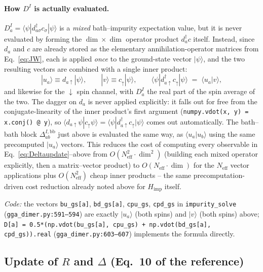 \documentclass[11pt]{article}
\newcommand{\Neff}{N_{\mathrm{eff}}}
\newcommand{\Himp}{H_{\mathrm{imp}}}
\begin{document}
\paragraph{How $D^I$ is actually evaluated.} $D^I_a=\langle\psi|d^\dagger_{a\sigma}c_\sigma|\psi\rangle$
is a \emph{mixed} bath--impurity expectation value, but it is never evaluated
by forming the $\dim\times\dim$ operator product $d^\dagger_ac$ itself.
Instead, since $d_a$ and $c$ are already stored as the elementary
annihilation-operator matrices from Eq.~\eqref{eq:JW}, each is applied
\emph{once} to the ground-state vector $|\psi\rangle$, and the two resulting
vectors are combined with a single inner product:
\begin{equation}
  |u_a\rangle \equiv d_{a\uparrow}|\psi\rangle,\qquad
  |v\rangle \equiv c_\uparrow|\psi\rangle,\qquad
  \langle\psi|d^\dagger_{a\uparrow}c_\uparrow|\psi\rangle \;=\; \langle u_a|v\rangle,
\end{equation}
and likewise for the $\downarrow$ spin channel, with $D^I_a$ the real part of
the spin average of the two. The dagger on $d_a$ is never applied
explicitly: it falls out for free from the conjugate-linearity of the inner
product's first argument (\texttt{numpy.vdot(x, y) = x.conj() @ y}), so
$\langle d_{a\uparrow}\psi|c_\uparrow\psi\rangle=\langle\psi|d^\dagger_{a\uparrow}c_\uparrow|\psi\rangle$
comes out automatically. The bath--bath block $\Delta^{I,\mathrm{bb}}_{ab}$
just above is evaluated the same way, as $\langle u_a|u_b\rangle$ using the
same precomputed $|u_a\rangle$ vectors. This reduces the cost of computing
every observable in Eq.~\eqref{eq:Deltaupdate}--above from $O(\Neff^2\cdot\dim^2)$
(building each mixed operator explicitly, then a matrix--vector product) to
$O(\Neff\cdot\dim)$ for the $\Neff$ vector applications plus $O(\Neff^2)$
cheap inner products -- the same precomputation-driven cost reduction
already noted above for $\Himp$ itself.

\emph{Code:} the vectors \texttt{bu\_gs[a]}, \texttt{bd\_gs[a]},
\texttt{cpu\_gs}, \texttt{cpd\_gs} in \texttt{impurity\_solve}
(\texttt{gga\_dimer.py:591--594}) are exactly $|u_a\rangle$ (both spins) and
$|v\rangle$ (both spins) above; \texttt{D[a] = 0.5*(np.vdot(bu\_gs[a], cpu\_gs)
+ np.vdot(bd\_gs[a], cpd\_gs)).real} (\texttt{gga\_dimer.py:603--607})
implements the formula directly.

\subsection{Update of $R$ and $\Delta$ (Eq.~10 of the reference)}
\label{sec:update}
\end{document}

